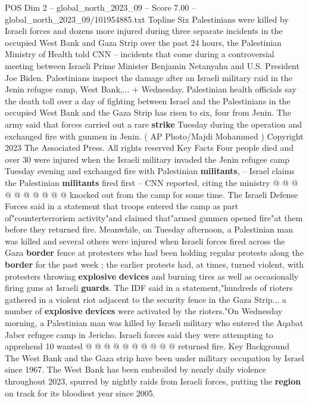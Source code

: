 \begin{textsample}{POS Dim 2 – global\_north\_2023\_09 – Score 7.00 – global\_north\_2023\_09/101954885.txt}  \label{ex:f2_pos_139}
Topline Six Palestinians were killed by Israeli forces and dozens more injured during three separate incidents in the occupied West Bank and Gaza Strip over the past 24 hours, the Palestinian Ministry of Health told CNN -- incidents that come during a controversial meeting between Israeli Prime Minister Benjamin Netanyahu and U.S.
President Joe Biden.
Palestinians inspect the damage after an Israeli military raid in the Jenin refugee camp, West Bank,... + Wednesday.
Palestinian health officials say the death toll over a day of fighting between Israel and the Palestinians in the occupied West Bank and the Gaza Strip has risen to six, four from Jenin.
The army said that forces carried out a rare \textbf{strike} Tuesday during the operation and exchanged fire with gunmen in Jenin. ( AP Photo/Majdi Mohammed ) Copyright 2023 The Associated Press.
All rights reserved Key Facts Four people died and over 30 were injured when the Israeli military invaded the Jenin refugee camp Tuesday evening and exchanged fire with Palestinian \textbf{militants}, -- Israel claims the Palestinian \textbf{militants} fired first -- CNN reported, citing the ministry @ @ @ @ @ @ @ @ @ @ knocked out from the camp for some time.
The Israeli Defense Forces said in a statement that troops entered the camp as part of"counterterrorism activity"and claimed that"armed gunmen opened fire"at them before they returned fire.
Meanwhile, on Tuesday afternoon, a Palestinian man was killed and several others were injured when Israeli forces fired across the Gaza \textbf{border} fence at protesters who had been holding regular protests along the \textbf{border} for the past week ; the earlier protests had, at times, turned violent, with protesters throwing \textbf{explosive} \textbf{devices} and burning tires as well as occasionally firing guns at Israeli \textbf{guards}.
The IDF said in a statement,"hundreds of rioters gathered in a violent riot adjacent to the security fence in the Gaza Strip... a number of \textbf{explosive} \textbf{devices} were activated by the rioters."On Wednesday morning, a Palestinian man was killed by Israeli military who entered the Aqabat Jaber refugee camp in Jericho.
Israeli forces said they were attempting to apprehend 10 wanted @ @ @ @ @ @ @ @ @ @ returned fire.
Key Background The West Bank and the Gaza strip have been under military occupation by Israel since 1967.
The West Bank has been embroiled by nearly daily violence throughout 2023, spurred by nightly raids from Israeli forces, putting the \textbf{region} on track for its bloodiest year since 2005.

\end{textsample}
